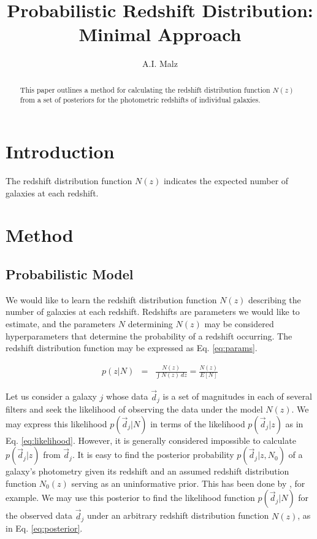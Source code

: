 \documentclass[12pt, onecolumn]{emulateapj}
\begin{document}
\title{Probabilistic Redshift Distribution: Minimal Approach}

\author{A.I. Malz}

\begin{abstract}
This paper outlines a method for calculating the redshift distribution function $N(z)$ from a set of posteriors for the photometric redshifts of individual galaxies.
\end{abstract}


\section{Introduction}

The redshift distribution function $N(z)$ indicates the expected number of galaxies at each redshift.  

\section{Method}

\subsection{Probabilistic Model}

We would like to learn the redshift distribution function $N(z)$ describing the number of galaxies at each redshift.  Redshifts are parameters we would like to estimate, and the parameters $N$ determining $N(z)$ may be considered hyperparameters that determine the probability of a redshift occurring.  The redshift distribution function may be expressed as Eq. \ref{eq:params}.

\begin{eqnarray}
\label{eq:params}
p(z|N) &=& \frac{N(z)}{\int N(z)\ dz} = \frac{N(z)}{E[N]}
\end{eqnarray}

Let us consider a galaxy $j$ whose data $\vec{d}_{j}$ is a set of magnitudes in each of several filters and seek the likelihood of observing the data under the model $N(z)$.  We may express this likelihood $p(\vec{d}_{j}|N)$ in terms of the likelihood $p(\vec{d}_{j}|z)$ as in Eq. \ref{eq:likelihood}.  However, it is generally considered impossible to calculate $p(\vec{d}_{j}|z)$ from $\vec{d}_{j}$.  It is easy to find the posterior probability $p(\vec{d}_{j}|z,N_{0})$ of a galaxy's photometry given its redshift and an assumed redshift distribution function $N_{0}(z)$ serving as an uninformative prior.  This has been done by \citet{she11}, for example.  We may use this posterior to find the likelihood function $p(\vec{d}_{j}|N)$ for the observed data $\vec{d}_{j}$ under an arbitrary redshift distribution function $N(z)$, as in Eq. \ref{eq:posterior}.  \citep{mar15}
\end{document}
